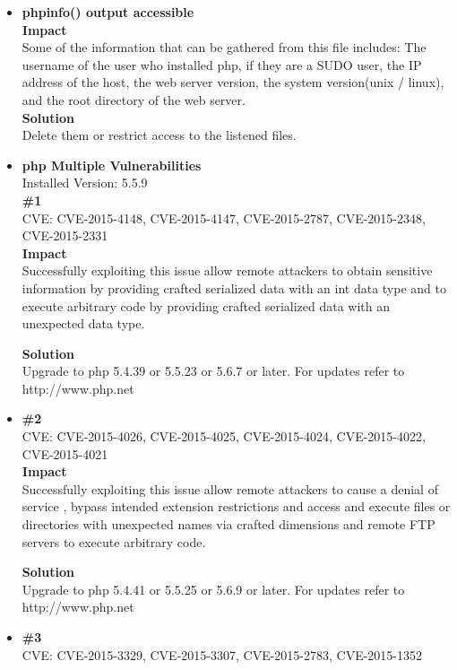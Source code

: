 \begin{itemize}
\item \textbf{phpinfo() output accessible}\\

\textbf{Impact}\\
Some of the information that can be gathered from this file includes: The username of the user who installed php, if they are a SUDO user, the IP address of the host, the web server version, the system version(unix / linux), and the root directory of the web server.\\

\textbf{Solution}\\
Delete them or restrict access to the listened files.\\

\item \textbf{php Multiple Vulnerabilities} \\
Installed Version: 5.5.9\\

\textbf{\#1}\\
CVE: CVE-2015-4148, CVE-2015-4147, CVE-2015-2787, CVE-2015-2348, CVE-2015-2331\\
\textbf{Impact} \\
Successfully exploiting this issue allow remote attackers to obtain sensitive information by providing crafted serialized data with an int data type and to execute arbitrary code by providing crafted serialized data with an unexpected data type.

\textbf{Solution}\\
Upgrade to php 5.4.39 or 5.5.23 or 5.6.7 or later. For updates refer to http://www.php.net

\item \textbf{\#2} \\
CVE: CVE-2015-4026, CVE-2015-4025, CVE-2015-4024, CVE-2015-4022, CVE-2015-4021\\

\textbf{Impact} \\
Successfully exploiting this issue allow remote attackers to cause a denial of service , bypass intended extension restrictions and access and execute files or directories with unexpected names via crafted dimensions and remote FTP servers to execute arbitrary code.

\textbf{Solution}\\
Upgrade to php 5.4.41 or 5.5.25 or 5.6.9 or later. For updates refer to http://www.php.net

\item \textbf{\#3} \\
CVE:	CVE-2015-3329, CVE-2015-3307, CVE-2015-2783, CVE-2015-1352\\


\end{itemize}
